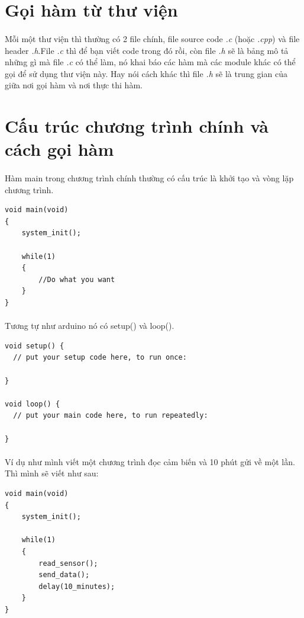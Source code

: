 \documentclass[12pt,a5paper]{book}
\begin{document}
\section{Gọi hàm từ thư viện}
\paragraph{}
Mỗi một thư viện thì thường có 2 file chính, file source code \textit{.c} (hoặc \textit{.cpp}) và file header \textit{.h}.File \textit{.c} thì để bạn viết code trong đó rồi, còn file \textit{.h} sẽ là bảng mô tả những gì mà file \textit{.c} có thể làm, nó khai báo các hàm mà các module khác có thể gọi để sử dụng thư viện này. Hay nói cách khác thì file \textit{.h} sẽ là trung gian của giữa nơi gọi hàm và nơi thực thi hàm.

\section{Cấu trúc chương trình chính và cách gọi hàm}
\paragraph{}
Hàm main trong chương trình chính thường có cấu trúc là khởi tạo và vòng lặp chương trình. 
\begin{lstlisting}
void main(void)
{
	system_init();
	
	while(1)
	{
		//Do what you want
	}
}
\end{lstlisting}
\paragraph{}
Tương tự như arduino nó có setup() và loop().
\begin{lstlisting}
void setup() {
  // put your setup code here, to run once:

}

void loop() {
  // put your main code here, to run repeatedly:

}
\end{lstlisting}
\paragraph{}
Ví dụ như mình viết một chương trình đọc cảm biến và 10 phút gửi về một lần. Thì mình sẽ viết như sau:
\begin{lstlisting}
void main(void)
{
	system_init();
	
	while(1)
	{
		read_sensor();
		send_data();
		delay(10_minutes);
	}
}
\end{lstlisting}
\end{document}
